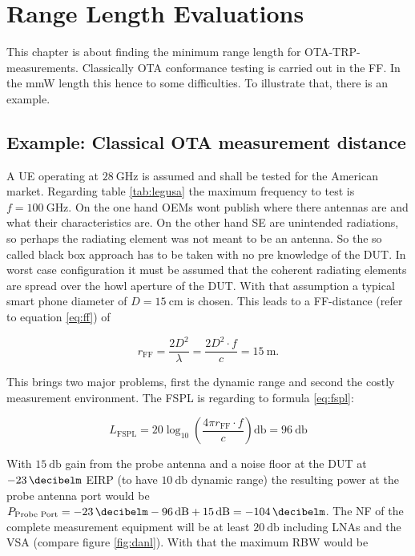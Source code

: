 \chapter{Range Length Evaluations}

This chapter is about finding the minimum range length for \ac{OTA}-\ac{TRP}-measurements. Classically \ac{OTA} conformance testing is carried out in the \ac{FF}. In the \ac{mmW} length this hence to some difficulties. To illustrate that, there is an example.

\section{Example: Classical OTA measurement distance}

A \ac{UE} operating at $\SI{28}{\giga\hertz}$ is assumed and shall be tested for the American market. Regarding table \ref{tab:legusa} the maximum frequency to test is $f = \SI{100}{\giga\hertz}$. On the one hand \acp{OEM} wont publish where there antennas are and what their characteristics are. On the other hand \ac{SE} are unintended radiations, so perhaps the radiating element was not meant to be an antenna. So the so called black box approach has to be taken with no pre knowledge of the \ac{DUT}. In worst case configuration it must be assumed that the coherent radiating elements are spread over the howl aperture of the \ac{DUT}. With that assumption a typical smart phone diameter of $D=\SI{15}{\centi\meter}$ is chosen. This leads to a \ac{FF}-distance (refer to equation \ref{eq:ff}) of 

\begin{equation}
r_{\text{FF}} = \frac{2D^2}{\lambda} = \frac{2D^2\cdot f}{c} = \SI{15}{\meter}.
\end{equation}

This brings two major problems, first the dynamic range and second the costly measurement environment. The \ac{FSPL} is regarding to formula \ref{eq:fspl}:

\begin{equation}
L_{\text{FSPL}} = 20\log_{10}\left(\frac{4\pi r_{\text{FF}} \cdot f}{c}\right)\si{\decibel} = \SI{96}{\decibel}
\end{equation}

With $\SI{15}{\decibel}$ gain from the probe antenna and a noise floor at the \ac{DUT} at $\SI{-23}{\decibelm}$ \ac{EIRP} (to have $\SI{10}{\decibel}$ dynamic range) the resulting power at the probe antenna port would be $P_{\text{Probe Port}} = \SI{-23}{\decibelm}-\SI{96}{\decibel}+\SI{15}{\decibel}=\SI{-104}{\decibelm}$. The \ac{NF} of the complete measurement equipment will be at least $\SI{20}{\decibel}$ including \acp{LNA} and the \ac{VSA} (compare figure \ref{fig:danl}). With that the maximum \ac{RBW} would be 

